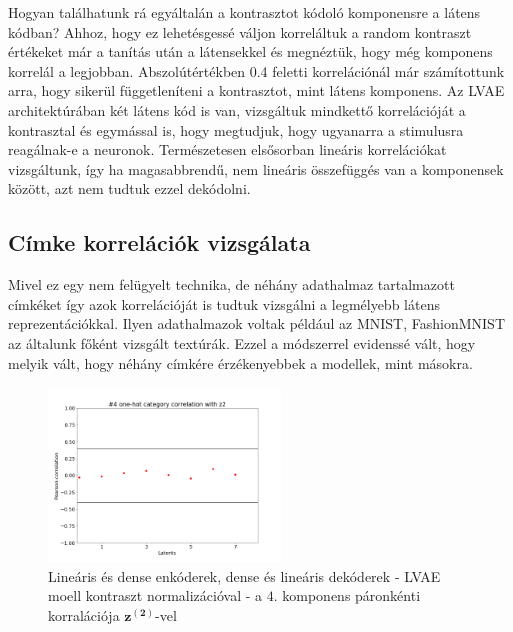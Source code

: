 \documentclass[12pt, english]{article}
\begin{document}
\vspace{4mm}

\par Hogyan találhatunk rá egyáltalán a kontrasztot kódoló komponensre a látens kódban? Ahhoz, hogy ez lehetésgessé váljon korreláltuk a random kontraszt értékeket már a tanítás után a látensekkel és megnéztük, hogy még komponens korrelál a legjobban. Abszolútértékben 0.4 feletti korrelációnál már számítottunk arra, hogy sikerül függetleníteni a kontrasztot, mint látens komponens. Az LVAE architektúrában két látens kód is van, vizsgáltuk mindkettő korrelációját a kontrasztal és egymással is, hogy megtudjuk, hogy ugyanarra a stimulusra reagálnak-e a neuronok. Természetesen elsősorban lineáris korrelációkat vizsgáltunk, így ha magasabbrendű, nem lineáris összefüggés van a komponensek között, azt nem tudtuk ezzel dekódolni.

\vspace{4mm}

\subsection{Címke korrelációk vizsgálata}

\vspace{4mm}

\par Mivel ez egy nem felügyelt technika, de néhány adathalmaz tartalmazott címkéket így azok korrelációját is tudtuk vizsgálni a legmélyebb látens reprezentációkkal. Ilyen adathalmazok voltak például az MNIST, FashionMNIST az általunk főként vizsgált textúrák. Ezzel a módszerrel evidenssé vált, hogy melyik vált, hogy néhány címkére érzékenyebbek a modellek, mint másokra.

\vspace{4mm}

\begin{figure}[H]
    \centering
    \includegraphics[width=0.55\textwidth]{17_DenseLinLinLadderVAE_contrastNorm-cat-4-to-z2-corr.png}
    \caption{Lineáris és dense enkóderek, dense és lineáris dekóderek - LVAE moell kontraszt normalizációval - a $4.$ komponens páronkénti korralációja $\bm{z^{(2)}}$-vel}
\end{figure}
\end{document}
